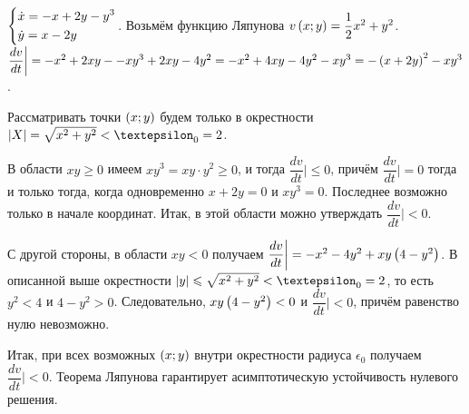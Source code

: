 \documentclass[a5paper,10pt]{article}
\begin{document}
$\left\{ \begin{aligned}& \dot{x} = -x + 2y - y^3 \\& \dot{y} = x - 2y\end{aligned} \right.$. Возьмём функцию Ляпунова $v\left(x; y\right) = \dfrac {1} {2} x^2 + y^2$.
$\dfrac {dv} {dt} \bigg| = -x^2 + 2xy - \linebreak - xy^3 + 2xy - 4y^2 = -x^2 + 4xy - 4y^2 - xy^3 = -\br{x + 2y}^2 - xy^3$.

Рассматривать точки $\left(x; y\right)$ будем только в окрестности $\vbr{X} = \sqrt{x^2 + y^2} < \epsilon_{0} = 2$.

В области $xy \ge 0$ имеем $xy^3 = xy \cdot y^2 \ge 0$, и тогда $\dfrac {dv} {dt} \bigg| \le 0$, причём $\dfrac {dv} {dt} \bigg| = 0$ тогда и только тогда, когда одновременно $x + 2y = 0$ и $xy^3 = 0$. Последнее возможно только в начале координат. Итак, в этой области можно утверждать $\dfrac {dv} {dt} \bigg| < 0$.

С другой стороны, в области $xy < 0$ получаем $\dfrac {dv} {dt} \bigg| = -x^2 - 4y^2 + xy \left(4 - y^2\right)$. В описанной выше окрестности $\vbr{y} \le \sqrt{x^2 + y^2} < \epsilon_{0} = 2$, то есть $y^2 < 4$ и $4 - y^2 > 0$.
Следовательно, $xy \left(4 - y^2\right) < 0$ и $\dfrac {dv} {dt} \bigg| < 0$, причём равенство нулю невозможно.

Итак, при всех возможных $\left(x; y\right)$ внутри окрестности радиуса $\epsilon_{0}$ получаем $\dfrac {dv} {dt} \bigg| < 0$. Теорема Ляпунова гарантирует асимптотическую устойчивость нулевого решения.
\end{document}

